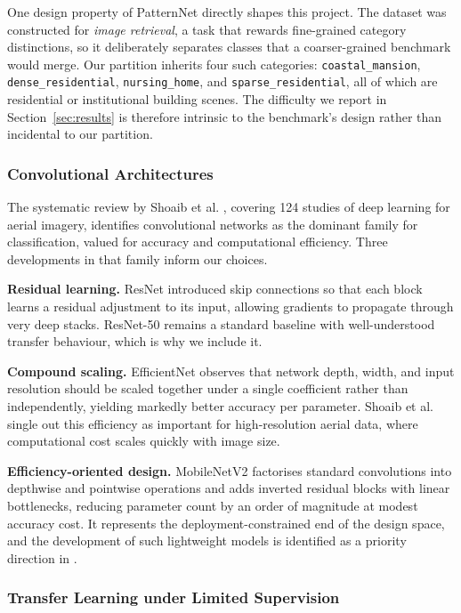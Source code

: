 \documentclass[11pt,twoside,a4paper]{article}
\begin{document}
One design property of PatternNet directly shapes this project. The dataset was
constructed for \emph{image retrieval}, a task that rewards fine-grained
category distinctions, so it deliberately separates classes that a
coarser-grained benchmark would merge. Our partition inherits four such categories: \texttt{coastal\_mansion}, \texttt{dense\_residential},
\texttt{nursing\_home}, and \texttt{sparse\_residential}, all of which are residential or institutional building scenes. The difficulty we report in Section~\ref{sec:results} is therefore intrinsic to the benchmark's design
rather than incidental to our partition.

\subsubsection{Convolutional Architectures}

The systematic review by Shoaib et al. \cite{Shoaib2025}, covering 124 studies
of deep learning for aerial imagery, identifies convolutional networks as the
dominant family for classification, valued for accuracy and computational
efficiency. Three developments in that family inform our choices.

\textbf{Residual learning.} ResNet \cite{He2016} introduced skip connections so
that each block learns a residual adjustment to its input, allowing gradients
to propagate through very deep stacks. ResNet-50 remains a standard baseline
with well-understood transfer behaviour, which is why we include it.

\textbf{Compound scaling.} EfficientNet \cite{Tan2019} observes that network
depth, width, and input resolution should be scaled together under a single
coefficient rather than independently, yielding markedly better accuracy per
parameter. Shoaib et al. \cite{Shoaib2025} single out this efficiency as
important for high-resolution aerial data, where computational cost scales
quickly with image size.

\textbf{Efficiency-oriented design.} MobileNetV2 \cite{Sandler2018} factorises
standard convolutions into depthwise and pointwise operations and adds inverted
residual blocks with linear bottlenecks, reducing parameter count by an order of
magnitude at modest accuracy cost. It represents the deployment-constrained end
of the design space, and the development of such lightweight models is
identified as a priority direction in \cite{Shoaib2025}.

\subsubsection{Transfer Learning under Limited Supervision}
\end{document}
